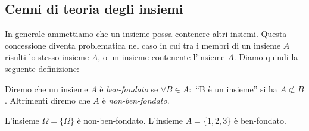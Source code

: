 \subsection{Cenni di teoria degli insiemi}
In generale ammettiamo che un insieme possa contenere altri insiemi. Questa concessione diventa problematica nel caso in cui tra i membri di un insieme $A$ risulti lo stesso insieme $A$, o un insieme contenente l'insieme $A$. Diamo quindi la seguente definizione:
\begin{definition}
    Diremo che un insieme $A$ è \emph{ben-fondato} se $\forall B \in A : $ ``B è un insieme'' si ha $A \not\subset B$. Altrimenti diremo che $A$ è \emph{non-ben-fondato}.
\end{definition}
\begin{example}
    L'insieme $\Omega = \{\Omega\}$ è non-ben-fondato. L'insieme $A = \{1,2,3\}$ è ben-fondato.
\end{example}

